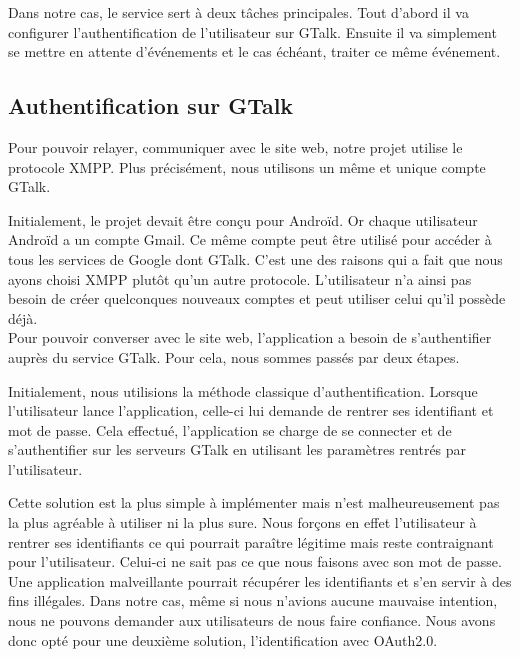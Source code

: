 Dans notre cas, le service sert à deux tâches principales. Tout d'abord il va configurer l'authentification
de l'utilisateur sur GTalk. Ensuite il va simplement se mettre en attente d'événements et le cas échéant, 
traiter ce même événement.
\\
 
 
 
\subsection{Authentification sur GTalk}
 
Pour pouvoir relayer, communiquer avec le site web, notre projet utilise le protocole XMPP. Plus 
précisément, nous utilisons un même et unique compte GTalk. 
 
Initialement, le projet devait être conçu pour Androïd. Or chaque utilisateur Androïd a un compte 
Gmail. Ce même compte peut être utilisé pour accéder à tous les services de Google dont GTalk.
C'est une des raisons qui a fait que nous ayons choisi XMPP plutôt qu'un autre protocole. L'utilisateur
n'a ainsi pas besoin de créer quelconques nouveaux comptes et peut utiliser celui qu'il possède déjà.
\\
 
 
Pour pouvoir converser avec le site web, l'application a besoin de s'authentifier auprès du service
GTalk. Pour cela, nous sommes passés par deux étapes. 
 
Initialement, nous utilisions la méthode classique d'authentification. Lorsque l'utilisateur lance 
l'application, celle-ci lui demande de rentrer ses identifiant et mot de passe. Cela effectué, 
l'application se charge de se connecter et de s'authentifier sur les serveurs GTalk en utilisant les
paramètres rentrés par l'utilisateur.
 
Cette solution est la plus simple à implémenter mais n'est malheureusement pas la plus agréable
à utiliser ni la plus sure. Nous forçons en effet l'utilisateur à rentrer ses identifiants ce qui 
pourrait paraître légitime mais reste contraignant pour l'utilisateur. Celui-ci ne sait pas ce que 
nous faisons avec son mot de passe. Une application malveillante pourrait récupérer les identifiants
et s'en servir à des fins illégales. Dans notre cas, même si nous n'avions aucune mauvaise intention,
nous ne pouvons demander aux utilisateurs de nous faire confiance. Nous avons donc opté pour une 
deuxième solution, l'identification avec OAuth2.0.
 
